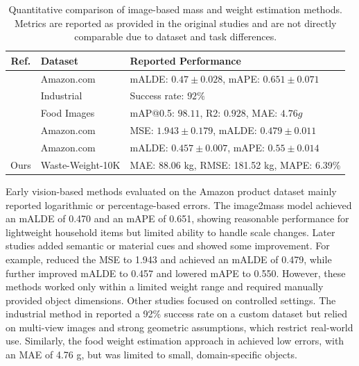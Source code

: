 \documentclass[journal,twoside,web]{ieeecolor}
\begin{document}
\begin{table}[ht!]
\centering
\small
\caption{Quantitative comparison of image-based mass and weight estimation methods. Metrics are reported as provided in the original studies and are not directly comparable due to dataset and task differences.}
\scriptsize
\begin{tabular}{cll}
\midrule
\textbf{Ref.} & \textbf{Dataset} & \textbf{Reported Performance} \\
\midrule

\cite{standley2017image2mass} &
Amazon.com &
mALDE: $0.47\pm0.028$, mAPE: $0.651\pm0.071$ \\

\cite{sato2024image} &
Industrial &
Success rate: $92\%$ \\

\cite{lee2025scalable} &
Food Images &
mAP@0.5: $98.11$, R2: $0.928$, MAE: $4.76 g$ \\

\cite{nath2024mass} &
Amazon.com &
MSE: $1.943\pm0.179$, mALDE: $0.479\pm0.011$ \\

\cite{wang2025image2mass++} &
Amazon.com &
mALDE: $0.457\pm0.007$, mAPE: $0.55\pm0.014$ \\

\midrule
Ours &
Waste-Weight-10K &
MAE: 88.06 kg, RMSE: 181.52 kg, MAPE: 6.39\% \\


\midrule
\end{tabular}
\label{tab:quantitative_comparison}
\end{table}


Early vision-based methods evaluated on the Amazon product dataset mainly reported logarithmic or percentage-based errors. The image2mass model \cite{standley2017image2mass} achieved an mALDE of 0.470 and an mAPE of 0.651, showing reasonable performance for lightweight household items but limited ability to handle scale changes. Later studies added semantic or material cues and showed some improvement. For example, \cite{nath2024mass} reduced the MSE to 1.943 and achieved an mALDE of 0.479, while \cite{wang2025image2mass++} further improved mALDE to 0.457 and lowered mAPE to 0.550. However, these methods worked only within a limited weight range and required manually provided object dimensions. Other studies focused on controlled settings. The industrial method in \cite{sato2024image} reported a 92\% success rate on a custom dataset but relied on multi-view images and strong geometric assumptions, which restrict real-world use. Similarly, the food weight estimation approach in \cite{lee2025scalable} achieved low errors, with an MAE of 4.76 g, but was limited to small, domain-specific objects. 
\end{document}
